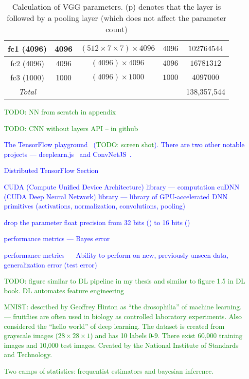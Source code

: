 \begin{table}
\begin{tabular}{|c|c|c|c|c|}
		fc1 (4096)        & 4096 &$(512\times7\times7)\times4096$ & $4096$ & $102764544$    \\ \hline
		fc2 (4096)        & 4096 &$(4096)\times4096$ & $4096$ & $16781312$    \\ \hline
		fc3 (1000)        & 1000 &$(4096)\times1000$ & $1000$ & $4097000$    \\ \hline
		\emph{Total} & & & & 138,357,544 \\ \hline
	\end{tabular}
	\caption{Calculation of VGG parameters. (p) denotes that the layer is followed by a pooling layer (which does not affect the parameter count)}
	\label{tab:vgg_parameter_count}
\end{table}




\textcolor{green}{TODO: NN from scratch in appendix}

\textcolor{green}{TODO: CNN without layers API -- in github}

\textcolor{blue}{The TensorFlow playground~\cite{tf_playground} (\textcolor{green}{TODO: screen shot}).  There are two other notable projects --- deeplearn.js~\cite{deeplearnjs} and ConvNetJS~\cite{convnet_js}.}


\textcolor{blue}{Distributed TensorFlow Section}


\textcolor{blue}{CUDA (Compute Unified Device Architecture) library --- computation}
\textcolor{blue}{cuDNN (CUDA Deep Neural Network) library --- library of GPU-accelerated DNN primitives (activations, normalization, convolutions, pooling)}


\textcolor{blue}{drop the parameter float precision from 32 bits () to 16 bits ()}

\textcolor{blue}{performance metrics --- Bayes error}

\textcolor{blue}{performance metrics --- Ability to perform on new, previously unseen data, generalization error (test error)}


\textcolor{green}{TODO: figure similar to DL pipeline in my thesis and similar to figure 1.5 in DL book. DL automates feature engineering}


\textcolor{green}{MNIST: described by Geoffrey Hinton as ``the drosophilia'' of machine learning. --- fruitflies are often used in biology as controlled laboratory experiments. Also considered the ``hello world'' of deep learning. The dataset is created from grayscale images ($28 \times 28 \times 1$) and has 10 labels 0-9.  There exist 60,000 training images and 10,000 test images. Created by the National Institute of Standards and Technology.}


\textcolor{green}{Two camps of statistics: frequentist estimators and bayesian inference.}



